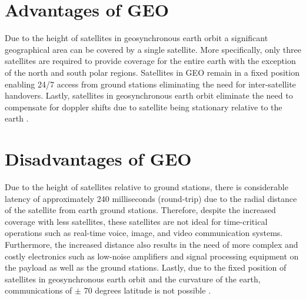 \documentclass[conference]{IEEEtran}
\begin{document}
\section{Advantages of GEO}
Due to the height of satellites in geosynchronous earth orbit a significant geographical area can be covered by a single satellite. More specifically, only three satellites are required to provide coverage for the entire earth with the exception of the north and south polar regions. Satellites in GEO remain in a fixed position enabling 24/7 access from ground stations eliminating the need for inter-satellite handovers. Lastly, satellites in geosynchronous earth orbit eliminate the need to compensate for doppler shifts due to satellite being stationary relative to the earth \cite{b4}. 

\section{Disadvantages of GEO}
Due to the height of satellites relative to ground stations, there is considerable latency of approximately 240 milliseconds (round-trip) due to the radial distance of the satellite from earth ground stations. Therefore, despite the increased coverage with less satellites, these satellites are not ideal for time-critical operations such as real-time voice, image, and video communication systems. Furthermore, the increased distance also results in the need of more complex and costly electronics such as low-noise amplifiers and signal processing equipment on the payload as well as the ground stations. Lastly, due to the fixed position of satellites in geosynchronous earth orbit and the curvature of the earth, communications of $\pm$ 70 degrees latitude is not possible \cite{b4}. 
\end{document}
